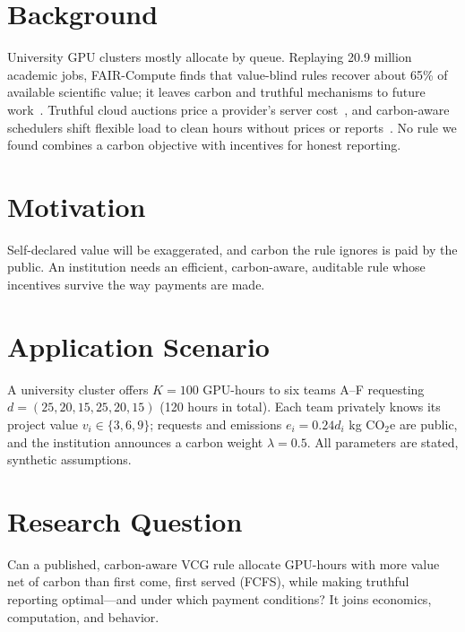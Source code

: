 \providecommand{\needchange}[1]{\textcolor{red}{\textbf{[NEED TO CHANGE: #1]}}}

\section{Background}\label{sec:background}
University GPU clusters mostly allocate by queue. Replaying 20.9 million academic jobs, FAIR-Compute finds that value-blind rules recover about 65\% of available scientific value; it leaves carbon and truthful mechanisms to future work~\cite{fair_compute2026}. Truthful cloud auctions price a provider's server cost~\cite{zhang2015iaas}, and carbon-aware schedulers shift flexible load to clean hours without prices or reports~\cite{radovanovic2021carbon}. No rule we found combines a carbon objective with incentives for honest reporting.

\section{Motivation}\label{sec:motivation}
Self-declared value will be exaggerated, and carbon the rule ignores is paid by the public. An institution needs an efficient, carbon-aware, auditable rule whose incentives survive the way payments are made.

\section{Application Scenario}\label{sec:scenario}
A university cluster offers $K=100$ GPU-hours to six teams A--F requesting $d=(25,20,15,25,20,15)$ (120 hours in total). Each team privately knows its project value $v_i\in\{3,6,9\}$; requests and emissions $e_i=0.24d_i$ kg CO$_2$e are public, and the institution announces a carbon weight $\lambda=0.5$. All parameters are stated, synthetic assumptions.

\section{Research Question}\label{sec:rq}
Can a published, carbon-aware VCG rule allocate GPU-hours with more value net of carbon than first come, first served (FCFS), while making truthful reporting optimal---and under which payment conditions? It joins economics, computation, and behavior.

